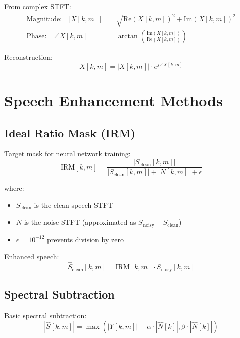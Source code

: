 \documentclass[12pt,a4paper]{article}
\begin{document}
From complex STFT:
\begin{align}
\text{Magnitude:} \quad |X[k, m]| &= \sqrt{\text{Re}(X[k,m])^2 + \text{Im}(X[k,m])^2} \\
\text{Phase:} \quad \angle X[k, m] &= \arctan\left(\frac{\text{Im}(X[k,m])}{\text{Re}(X[k,m])}\right)
\end{align}

Reconstruction:
\begin{equation}
X[k, m] = |X[k, m]| \cdot e^{j\angle X[k, m]}
\end{equation}

\section{Speech Enhancement Methods}

\subsection{Ideal Ratio Mask (IRM)}

Target mask for neural network training:
\begin{equation}
\text{IRM}[k, m] = \frac{|S_{\text{clean}}[k, m]|}{|S_{\text{clean}}[k, m]| + |N[k, m]| + \epsilon}
\end{equation}

where:
\begin{itemize}
    \item $S_{\text{clean}}$ is the clean speech STFT
    \item $N$ is the noise STFT (approximated as $S_{\text{noisy}} - S_{\text{clean}}$)
    \item $\epsilon = 10^{-12}$ prevents division by zero
\end{itemize}

Enhanced speech:
\begin{equation}
\hat{S}_{\text{clean}}[k, m] = \text{IRM}[k, m] \cdot S_{\text{noisy}}[k, m]
\end{equation}

\subsection{Spectral Subtraction}

Basic spectral subtraction:
\begin{equation}
|\hat{S}[k, m]| = \max\left(|Y[k, m]| - \alpha \cdot |\hat{N}[k]|, \beta \cdot |\hat{N}[k]|\right)
\end{equation}
\end{document}
